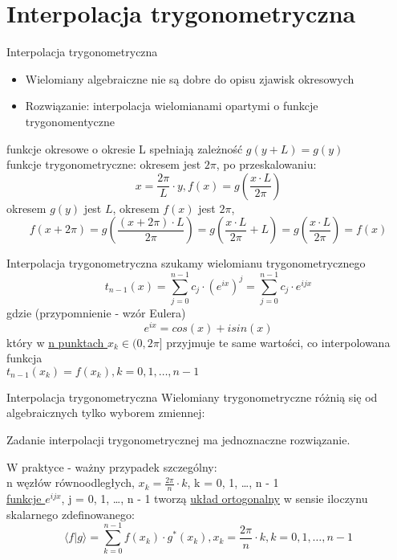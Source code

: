 \section{Interpolacja trygonometryczna}
\begin{frame}{Interpolacja trygonometryczna}
\begin{itemize}
    \item Wielomiany algebraiczne nie są dobre do opisu zjawisk okresowych
    \item Rozwiązanie: interpolacja wielomianami opartymi o funkcje  trygonomentyczne
\end{itemize}

		 funkcje okresowe o okresie L spełniają zależność  $g(y + L) = g(y)$\\
	 funkcje  trygonometryczne: okresem jest $2\pi$, po przeskalowaniu:
	$$	x = \frac{2\pi}{L} \cdot y, f(x) = g(\frac{x \cdot L}{2\pi})$$
 okresem $g(y)$ jest $L$, okresem $f(x)$ jest $2\pi$, 
	 $$f(x+2\pi)=g(\frac{(x+2\pi) \cdot L}{2\pi})=g(\frac{x \cdot L}{2\pi}+L)=
	g(\frac{x \cdot L}{2\pi})=f(x)$$
\end{frame}
\begin{frame}{Interpolacja trygonometryczna}
	szukamy wielomianu trygonometrycznego
	\[
		t_{n-1}(x) =\sum\limits_{j = 0}^{n-1} c_j \cdot (e^{ix})^{j}= \sum\limits_{j = 0}^{n-1} c_j \cdot e^{ijx}
	\]
	gdzie (przypomnienie - wzór Eulera)
	$$
	e^{ix}=cos(x)+isin(x)
	$$
	który w \underline{n punktach $x_k \in (0, 2\pi]$} przyjmuje te same wartości, co interpolowana funkcja
	\\ $t_{n - 1}(x_k) = f(x_k), k = 0, 1, \dots, n - 1$
\end{frame}
\begin{frame}{Interpolacja trygonometryczna}
Wielomiany trygonometryczne różnią się od algebraicznych tylko wyborem zmiennej:
	\begin{theorem}
		Zadanie interpolacji trygonometrycznej ma jednoznaczne rozwiązanie.
	\end{theorem}
		W praktyce - ważny przypadek szczególny: \\
		n węzłów równoodległych, \underline{$x_k = \frac{2\pi}{n}\cdot k$}, k = 0, 1, \dots, n - 1 \\
		\underline{funkcje $e^{ijx}$}, j = 0, 1, \dots, n - 1 tworzą \underline{układ ortogonalny} w sensie iloczynu skalarnego zdefinowanego:
		$$
			\langle f|g \rangle = \sum\limits_{k = 0}^{n-1} f(x_k) \cdot g^* (x_k), x_k = \frac{2\pi}{n} \cdot k, k = 0, 1, \dots, n-1
		$$
		\end{frame}
